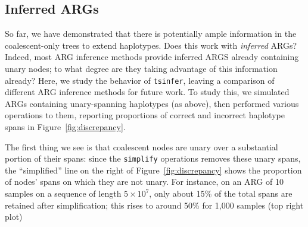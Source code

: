 \documentclass[10pt,twoside,lineno]{gsajnl}
\newcommand{\tsinfer}{\texttt{tsinfer}}
\begin{document}
%
%

\subsection{Inferred ARGs}

So far, we have demonstrated that there is potentially ample information
in the coalescent-only trees to extend haplotypes.
Does this work with \emph{inferred} ARGs?
Indeed, most ARG inference methods provide inferred ARGS already containing unary nodes;
to what degree are they taking advantage of this information already?
Here, we study the behavior of \tsinfer{},
leaving a comparison of different ARG inference methods for future work.
To study this, we simulated ARGs containing unary-spanning haplotypes (as above),
then performed various operations to them,
reporting proportions of correct and incorrect haplotype spans in Figure~\ref{fig:discrepancy}.

The first thing we see is that coalescent nodes are unary
over a substantial portion of their spans:
since the \texttt{simplify} operations removes these unary spans,
the ``simplified'' line on the right of Figure~\ref{fig:discrepancy} shows
the proportion of nodes' spans on which they are not unary.
For instance, on an ARG of 10 samples on a sequence of length $5 \times 10^7$,
only about 15\% of the total spans are retained after simplification;
this rises to around 50\% for 1,000 samples (top right plot)
\end{document}
